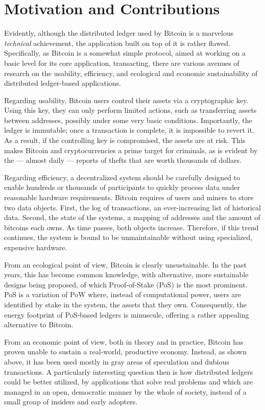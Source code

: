 \section{Motivation and Contributions}

Evidently, although the distributed ledger used by Bitcoin
is a marvelous \emph{technical} achievement, the application built on top of it
is rather flawed. Specifically, as Bitcoin is a somewhat simple protocol, aimed
at working on a basic level for its core application, \ie transacting, there
are various avenues of research on the usability, efficiency, and ecological
and economic sustainability of distributed ledger-based applications.

Regarding usability, Bitcoin users control their assets via a cryptographic
key. Using this key, they can only perform limited actions, such as
transferring assets between addresses, possibly under some very basic
conditions. Importantly, the ledger is immutable; once a transaction is
complete, it is impossible to revert it. As a result, if the controlling key is
compromised, the assets are at risk. This makes Bitcoin and cryptocurrencies a
prime target for criminals, as is evident by the --- almost daily --- reports
of thefts that are worth thousands of dollars.

Regarding efficiency, a decentralized system should be carefully designed to
enable hundreds or thousands of participants to quickly process data under
reasonable hardware requirements. Bitcoin requires of users and miners to store
two data objects. First, the log of transactions, an ever-increasing list of
historical data. Second, the state of the systems, \ie a mapping of addresses
and the amount of bitcoins each owns. As time passes, both objects increase.
Therefore, if this trend continues, the system is bound to be unmaintainable
without using specialized, expensive hardware.

From an ecological point of view, Bitcoin is clearly unsustainable. In the past years,
this has become common knowledge, with alternative, more sustainable designs
being proposed, of which Proof-of-Stake (PoS) is the most prominent. PoS is a
variation of PoW where, instead of computational power, users are identified by
stake in the system, \ie the assets that they own. Consequently, the energy
footprint of PoS-based ledgers is minuscule, offering a rather appealing
alternative to Bitcoin.

From an economic point of view, both in theory and in practice, Bitcoin has
proven unable to sustain a real-world, productive economy. Instead, as shown
above, it has been used mostly in gray areas of speculation and dubious
transactions. A particularly interesting question then is how distributed ledgers could be
better utilized, by applications that solve real problems and which are managed
in an open, democratic manner by the whole of society, instead of a small group
of insiders and early adopters.

